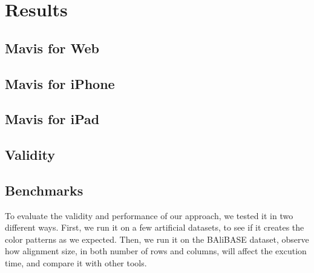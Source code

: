 \chapter{Results}\label{chap:Results}

\section{Mavis for Web}

\section{Mavis for iPhone}

\section{Mavis for iPad}

\section{Validity}

\section{Benchmarks}

To evaluate the validity and performance of our approach, we tested it in two different ways. First, we run it on a few artificial datasets, to see if it creates the color patterns as we expected. Then, we run it on the BAliBASE dataset, observe how alignment size, in both number of rows and columns, will affect the excution time, and compare it with other tools.

